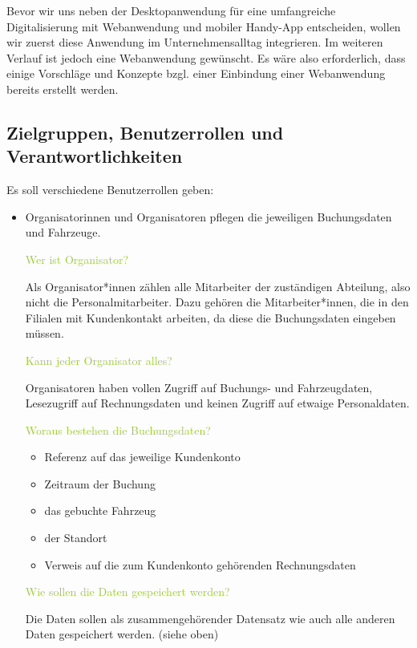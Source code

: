 \textcolor{NavyBlue}{Bevor wir uns neben der Desktopanwendung für eine umfangreiche Digitalisierung mit Webanwendung und mobiler Handy-App entscheiden, wollen wir zuerst diese Anwendung im Unternehmensalltag integrieren. Im weiteren Verlauf ist jedoch eine Webanwendung gewünscht. Es wäre also erforderlich, dass einige Vorschläge und Konzepte bzgl. einer Einbindung einer Webanwendung bereits erstellt werden.}

\subsection{Zielgruppen, Benutzerrollen und Verantwortlichkeiten}

Es soll verschiedene Benutzerrollen geben: 

\begin{itemize}
    \item Organisatorinnen und Organisatoren pflegen die jeweiligen Buchungsdaten und Fahrzeuge. 
    
    \textcolor{YellowGreen}{Wer ist Organisator?}

    \textcolor{NavyBlue}{Als Organisator*innen zählen alle Mitarbeiter der zuständigen Abteilung, also nicht die Personalmitarbeiter. Dazu gehören die Mitarbeiter*innen, die in den Filialen mit Kundenkontakt arbeiten, da diese die Buchungsdaten eingeben müssen.}

    \textcolor{YellowGreen}{Kann jeder Organisator alles?}

    \textcolor{NavyBlue}{Organisatoren haben vollen Zugriff auf Buchungs- und Fahrzeugdaten, Lesezugriff auf Rechnungsdaten und keinen Zugriff auf etwaige Personaldaten.}

    \textcolor{YellowGreen}{Woraus bestehen die Buchungsdaten?}
    \textcolor{NavyBlue}{
        \begin{itemize}
            \item Referenz auf das jeweilige Kundenkonto
            \item Zeitraum der Buchung
            \item das gebuchte Fahrzeug
            \item der Standort
            \item Verweis auf die zum Kundenkonto gehörenden Rechnungsdaten 
        \end{itemize}
    }

    \textcolor{YellowGreen}{Wie sollen die Daten gespeichert werden?}

    \textcolor{NavyBlue}{Die Daten sollen als zusammengehörender Datensatz wie auch alle anderen Daten gespeichert werden. (siehe oben)}


\end{itemize}
